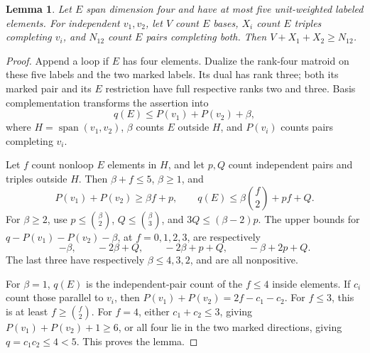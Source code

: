 \documentclass[11pt,a4paper]{article}
\newtheorem{lemma}[theorem]{Lemma}
\theoremstyle{remark}\newtheorem{remark}[theorem]{Remark}
\newcommand{\spn}{\operatorname{span}}     %
\begin{document}
\begin{lemma}\label{mrn:e:fp:lem:2point}
Let $E$ span dimension four and have at most five unit-weighted labeled elements. For independent $v_1,v_2$, let $V$ count $E$ bases, $X_i$ count $E$ triples completing $v_i$, and $N_{12}$ count $E$ pairs completing both. Then $V+X_1+X_2\ge N_{12}$.
\end{lemma}
\begin{proof}
Append a loop if $E$ has four elements. Dualize the rank-four matroid on these five labels and the two marked labels. Its dual has rank three; both its marked pair and its $E$ restriction have full respective ranks two and three. Basis complementation transforms the assertion into
\[
 q(E)\le P(v_1)+P(v_2)+\beta,
\]
where $H=\spn(v_1,v_2)$, $\beta$ counts $E$ outside $H$, and $P(v_i)$ counts pairs completing $v_i$.

Let $f$ count nonloop $E$ elements in $H$, and let $p,Q$ count independent pairs and triples outside $H$. Then $\beta+f\le5$, $\beta\ge1$, and
\[
 P(v_1)+P(v_2)\ge\beta f+p,\qquad
 q(E)\le\beta\binom f2+pf+Q.
\]
For $\beta\ge2$, use $p\le\binom\beta2$, $Q\le\binom\beta3$, and $3Q\le(\beta-2)p$. The upper bounds for $q-P(v_1)-P(v_2)-\beta$, at $f=0,1,2,3$, are respectively
\[
 -\beta,\qquad-2\beta+Q,\qquad-2\beta+p+Q,\qquad-\beta+2p+Q.
\]
The last three have respectively $\beta\le4,3,2$, and are all nonpositive.

For $\beta=1$, $q(E)$ is the independent-pair count of the $f\le4$ inside elements. If $c_i$ count those parallel to $v_i$, then $P(v_1)+P(v_2)=2f-c_1-c_2$. For $f\le3$, this is at least $f\ge\binom f2$. For $f=4$, either $c_1+c_2\le3$, giving $P(v_1)+P(v_2)+1\ge6$, or all four lie in the two marked directions, giving $q=c_1c_2\le4<5$. This proves the lemma.
\end{proof}
\end{document}
